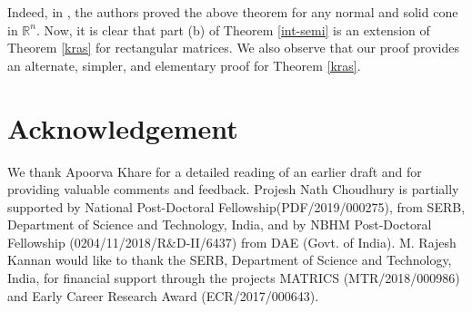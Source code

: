 \documentclass[11pt]{article}
\begin{document}
Indeed, in \cite{kras-lif-sob}, the authors proved the above theorem for
any normal and solid cone in $\mathbb{R}^n$. Now, it is clear that part
(b) of Theorem \ref{int-semi} is an extension of Theorem \ref {kras} for
rectangular matrices. We also observe that our proof provides an
alternate, simpler, and elementary proof for Theorem \ref{kras}.

\section{Acknowledgement} We thank Apoorva Khare for a detailed reading
of an earlier draft and for providing valuable comments and feedback.
Projesh Nath Choudhury  is partially supported by National Post-Doctoral
Fellowship(PDF/2019/000275), from SERB, Department of Science and
Technology, India,  and by NBHM Post-Doctoral Fellowship
(0204/11/2018/R$\&$D-II/6437) from DAE (Govt. of India). M. Rajesh Kannan
would like to thank  the SERB, Department of Science and Technology,
India, for financial support through the projects  MATRICS
(MTR/2018/000986) and Early Career Research Award (ECR/2017/000643).



\end{document}
